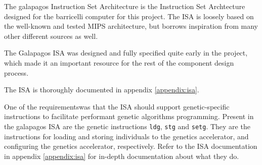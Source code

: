 The \Gls{galapagos} Instruction Set Architecture is the Instruction Set Archtecture designed for the \Gls{barricelli} computer for this project.
The ISA is loosely based on the well-known and tested MIPS architecture\cn, but borrows inspiration from many other different sources as well.

The Galapagos ISA was designed and fully specified quite early in the project, which made it an important resource for the rest of the component design process.

The ISA is thoroughly documented in appendix \vref{appendix:isa}.

One of the requirements\cn was that the ISA should support genetic-specific instructions to facilitate performant genetic algorithms programming.
Present in the \Gls{galapagos} ISA are the genetic instructions \texttt{ldg}, \texttt{stg} and \texttt{setg}.
They are the instructions for loading and storing \glspl{individual} to the genetics accelerator, and configuring the genetics accelerator, respectively.
Refer to the ISA documentation in appendix \vref{appendix:isa} for in-depth documentation about what they do.
